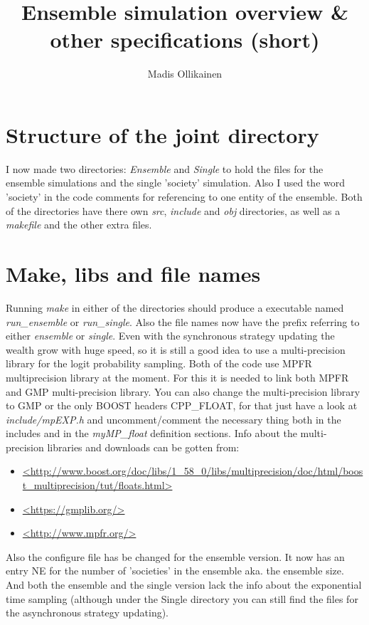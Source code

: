 \documentclass{article}
\author{Madis Ollikainen}
\title{Ensemble simulation overview \& other specifications (short)}
\begin{document}
\maketitle

\section{Structure of the joint directory}
I now made two directories: \emph{Ensemble} and \emph{Single} to hold the files for the ensemble simulations and the single 'society' simulation. Also I used the word 'society' in the code comments for referencing to one entity of the ensemble. Both of the directories have there own \emph{src}, \emph{include} and \emph{obj} directories, as well as a \emph{makefile} and the other extra files. 

\section{Make, libs and file names}
Running \emph{make} in either of the directories should produce a executable named \emph{run\_ensemble} or \emph{run\_single}. Also the file names now have the prefix referring to either \emph{ensemble} or \emph{single}. Even with the synchronous strategy updating the wealth grow with huge speed, so it is still a good idea to use a multi-precision library for the logit probability sampling. Both of the code use MPFR multiprecision library at the moment. For this it is needed to link both MPFR and GMP multi-precision library. You can also change the multi-precision library to GMP or the only BOOST headers CPP\_FLOAT, for that just have a look at \emph{include/mpEXP.h} and uncomment/comment the necessary thing both in the includes and in the \emph{myMP\_float} definition sections. Info about the multi-precision libraries and downloads can be gotten from: 
\begin{itemize}
\item \url{<http://www.boost.org/doc/libs/1_58_0/libs/multiprecision/doc/html/boost_multiprecision/tut/floats.html>}
\item \url{<https://gmplib.org/>}       
\item \url{<http://www.mpfr.org/>}
\end{itemize}
Also the configure file has be changed for the ensemble version. It now has an entry NE for the number of 'societies' in the ensemble aka. the ensemble size. And both the ensemble and the single version lack the info about the exponential time sampling (although under the Single directory you can still find the files for the asynchronous strategy updating). 
\end{document}
